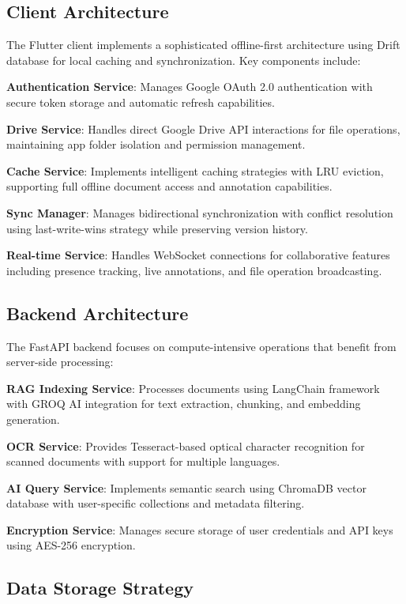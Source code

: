 \documentclass[conference]{IEEEtran}
\begin{document}
\subsection{Client Architecture}

The Flutter client implements a sophisticated offline-first architecture using Drift database for local caching and synchronization. Key components include:

\textbf{Authentication Service}: Manages Google OAuth 2.0 authentication with secure token storage and automatic refresh capabilities.

\textbf{Drive Service}: Handles direct Google Drive API interactions for file operations, maintaining app folder isolation and permission management.

\textbf{Cache Service}: Implements intelligent caching strategies with LRU eviction, supporting full offline document access and annotation capabilities.

\textbf{Sync Manager}: Manages bidirectional synchronization with conflict resolution using last-write-wins strategy while preserving version history.

\textbf{Real-time Service}: Handles WebSocket connections for collaborative features including presence tracking, live annotations, and file operation broadcasting.

\subsection{Backend Architecture}

The FastAPI backend focuses on compute-intensive operations that benefit from server-side processing:

\textbf{RAG Indexing Service}: Processes documents using LangChain framework with GROQ AI integration for text extraction, chunking, and embedding generation.

\textbf{OCR Service}: Provides Tesseract-based optical character recognition for scanned documents with support for multiple languages.

\textbf{AI Query Service}: Implements semantic search using ChromaDB vector database with user-specific collections and metadata filtering.

\textbf{Encryption Service}: Manages secure storage of user credentials and API keys using AES-256 encryption.

\subsection{Data Storage Strategy}
\end{document}
